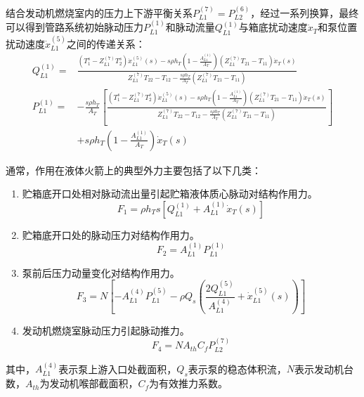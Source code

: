 结合发动机燃烧室内的压力上下游平衡关系$P_{L1}^{(7)}=P_{L2}^{(6)}$，经过一系列换算，最终可以得到管路系统初始脉动压力$P_{L1}^{(1)}$和脉动流量$Q_{L1}^{(1)}$与箱底扰动速度$\dot{x}_T$和泵位置扰动速度$\dot{x}_{L1}^{(5)}$之间的传递关系：
\begin{align}
  \label{eq:Total-Transfer}
  Q_{L1}^{(1)}= & \frac{\left( {T}_{1}^{s}-Z_{L1}^{(7)} {T}_{2}^{s} \right)\dot{x}_{L1}^{(5)}(s)- s{\rho}{h_T}\left( 1- {\displaystyle \frac{A_{L1}^{(1)}}{A_T}} \right) \left( Z_{L1}^{(7)} {T}_{21}- {T}_{11} \right) {\dot{x}_T(s)} } {Z_{L1}^{(7)} {T}_{22}- {T}_{12}- {\displaystyle \frac{s\rho h_T}{A_T}} \left( Z_{L1}^{(7)} {T}_{21}- {T}_{11} \right)} \nonumber \\
  P_{L1}^{(1)}=%
                & -\frac{s\rho{h_T}}{A_T} \left[
  \frac{\left( {T}_{1}^{s}-Z_{L1}^{(7)} {T}_{2}^{s} \right)\dot{x}_{L1}^{(5)}(s)- s{\rho}{h_T}\left( 1- { \frac{A_{L1}^{(1)}}{A_T}} \right) \left( Z_{L1}^{(7)} {T}_{21}- {T}_{11} \right) {\dot{x}_T(s)} } {Z_{L1}^{(7)} {T}_{22}- {T}_{12}- { \frac{s\rho h_T}{A_T}} \left( Z_{L1}^{(7)} {T}_{21}- {T}_{11} \right)}
  \right] \nonumber                                                                                                                                                                                                                                                                                                                                                        \\
                & + s\rho{h}_T \left(1- \frac{A_{L1}^{(1)}}{A_T}\right){\dot{x}_T}(s)
\end{align}

通常，作用在液体火箭上的典型外力主要包括了以下几类：\label{Page:Typical-Feedback-Force}
\begin{enumerate}[leftmargin=\parindent, align=parleft, labelindent=0pt, labelwidth=*]
  \item 贮箱底开口处相对脉动流出量引起贮箱液体质心脉动对结构作用力。
        \begin{equation}
          F_1=\rho h_Ts \left[ Q_{L1}^{(1)}+ A_{L1}^{(1)}\dot{x}_T(s) \right]
        \end{equation}
  \item 贮箱底开口处的脉动压力对结构作用力。
        \begin{equation}
          F_2=A_{L1}^{(1)}P_{L1}^{(1)}
        \end{equation}
  \item 泵前后压力动量变化对结构作用力。
        \begin{equation}
          F_3=N\left[ -A_{L1}^{(4)}P_{L1}^{(5)}- \rho Q_s \left( \frac{2Q_{L1}^{(5)}}{A_{L1}^{(4)}}+ \dot{x}_{L1}^{(5)}(s) \right)\right]
        \end{equation}
  \item 发动机燃烧室脉动压力引起脉动推力。
        \begin{equation}
          F_4=NA_{th}C_f P_{L2}^{(7)}
        \end{equation}
\end{enumerate}
其中，$A_{L1}^{(4)}$表示泵上游入口处截面积，$Q_s$表示泵的稳态体积流，$N$表示发动机台数，$A_{th}$为发动机喉部截面积，$C_f$为有效推力系数。

